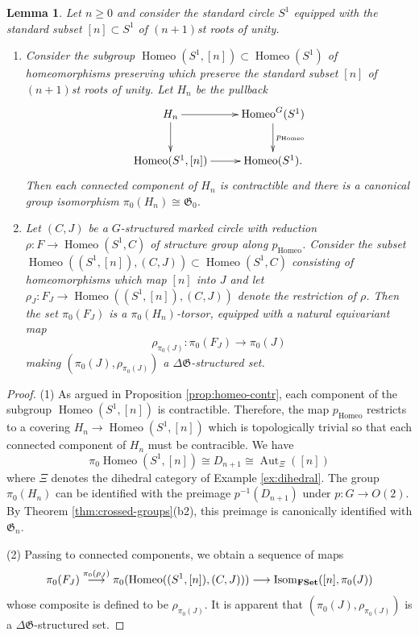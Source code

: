 \documentclass[english,11pt,leqno]{article}
\def\Gen{\mathfrak{G}}
\def\Aut{\operatorname{Aut}\nolimits}
\def\on{\operatorname}
\def\lra{\longrightarrow}
\def\Isom{\on{Isom}}
\def\DG{ {\Delta \Gen}}
\def\Homeo{{ \on{Homeo}}}
\def\FSet{{\bf FSet}}
\newtheorem{lem}[thm]{Lemma}
\theoremstyle{definition}
\theoremstyle{remark}
\numberwithin{equation}{section}
\begin{document}
\begin{lem}\label{lem:pi0} Let $n \ge 0$ and consider the standard circle $S^1$ equipped with the standard subset
	$[n] \subset S^1$ of $(n+1)$st roots of unity.
	\begin{enumerate}
		\item Consider the subgroup $\Homeo(S^1, [n]) \subset \Homeo(S^1)$ of homeomorphisms
			preserving which preserve the standard subset $[n]$ of $(n+1)$st roots of
			unity. Let $H_n$ be the pullback 
			\[ 
				\xymatrix{ H_n\ar[d] \ar[r]&\Homeo^G(S^1) \ar[d]^{p_\Homeo} \\ 
				\Homeo(S^1, [n]) \ar[r]&\Homeo(S^1).  } 
			\] 
			Then each connected component of $H_n$ is contractible
			and there is a canonical group isomorphism $\pi_0(H_n) \cong \Gen_0$. 
		\item Let $(C,J)$ be a $G$-structured marked circle with reduction $\rho: F \to \Homeo(S^1, C)$ of structure
			group along $ p_\Homeo$. Consider the subset $\Homeo( (S^1, [n]), (C, J)) \subset \Homeo(S^1, C)$ 
			consisting of homeomorphisms which map $[n]$ into $J$ and let 
			$\rho_J: F_J \to \Homeo( (S^1, [n]), (C, J))$ denote the restriction of
			$\rho$. Then the set $\pi_0(F_J)$ is a $\pi_0(H_n)$-torsor, equipped with a
			natural equivariant map 
			\[
				\rho_{\pi_0(J)}: \pi_0(F_J) \to \pi_0(J)
			\]
			making $(\pi_0(J), \rho_{\pi_0(J)})$ a $\DG$-structured set.
	\end{enumerate}
\end{lem}
\begin{proof} (1) As argued in Proposition \ref{prop:homeo-contr}, each component of the
 subgroup $\Homeo(S^1, [n])$ is contractible. Therefore, the map $p_\Homeo$ restricts to a covering 
 $H_n \to \Homeo(S^1,[n])$ which is topologically trivial so that each connected component of $H_n$
 must be contracible. We have
 \[
	 \pi_0 \Homeo(S^1, [n]) \cong D_{n+1} \cong \Aut_\Xi([n])
 \]
 where $\Xi$ denotes the dihedral category of Example \ref {ex:dihedral}. The group $\pi_0(H_n)$ can
 be identified with the preimage $p^{-1}(D_{n+1})$ under $p: G\to O(2)$. By Theorem \ref{thm:crossed-groups}(b2), 
 this preimage is canonically identified with $\Gen_n$. 

 \noindent
 (2) Passing to connected components, we obtain a sequence of maps
	\[
			\pi_0(F_J) \overset{\pi_0(\rho_J)}{\lra} \pi_0(\Homeo( (S^1, [n]), (C, J)))
			\lra \Isom_{\FSet}([n],
			\pi_0(J))
	\]
	whose composite is defined to be $\rho_{\pi_0(J)}$. It is apparent that $(\pi_0(J),
	\rho_{\pi_0(J)})$ is a $\DG$-structured set.
\end{proof}
\end{document}
